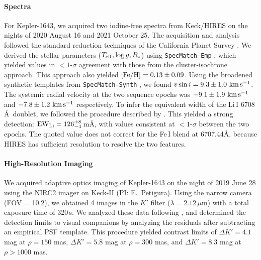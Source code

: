 \documentclass[12pt,twocolumn,linenumbers]{aastex63}
\newcommand{\mkms}{{\rm \,km\,s^{-1}}}  %
\begin{document}
\paragraph{Spectra}
For Kepler-1643, we acquired two iodine-free spectra from Keck/HIRES
on the nights of 2020 August 16 and 2021 October 25.  The acquisition
and analysis followed the standard reduction techniques of the
California Planet Survey \citep{howard_cps_2010}.  We derived the
stellar parameters ($T_{\rm eff}, \log g, R_\star$) using
\texttt{SpecMatch-Emp} \citep{yee_SM_2017}, which yielded values in
$<1$-$\sigma$ agreement with those from the cluster-isochrone
approach.  This approach also yielded $[{\rm Fe/H}]=0.13 \pm 0.09$.
Using the broadened synthetic templates from \texttt{SpecMatch-Synth}
\citep{petigura_cksi_2017}, we found $v\sin i = 9.3 \pm 1.0\,\mkms$.
The systemic radial velocity at the two sequence epochs was $-9.1 \pm
1.9\,\mkms$ and $-7.8\pm 1.2\,\mkms$ respectively.  To infer the
equivalent width of the Li\,\textsc{I} 6708\,\AA\ doublet, we followed
the procedure described by \citet{bouma_2021_ngc2516}.  This yielded a
strong detection: ${\rm EW}_{\rm Li} = 126^{+8}_{-4}$\,m\AA, with
values consistent at $<1$-$\sigma$ between the two epochs.   The
quoted value does not correct for the Fe\,\textsc{I} blend at
6707.44\AA, because HIRES has sufficient resolution to resolve the two
features.  


\paragraph{High-Resolution Imaging}
We acquired adaptive optics imaging of Kepler-1643 on the night of
2019 June 28 using the NIRC2 imager on Keck-II (PI: E.~Petigura).
Using the narrow camera (FOV = 10.2\arcsec), we obtained 4 images in
the $K'$ filter ($\lambda = 2.12\,\mu$m) with a total exposure time of
320\,s. We analyzed these data following \citet{kraus_impact_2016},
and determined the detection limits to visual companions by analyzing
the residuals after subtracting an empirical PSF template. 
This procedure yielded contrast limits of $\Delta K' = 4.1$ mag at
$\rho = 150$ mas, $\Delta K' = 5.8$ mag at $\rho = 300$ mas, and
$\Delta K' = 8.3$ mag at $\rho > 1000$ mas.
\end{document}

